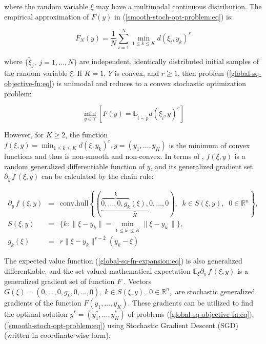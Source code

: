 \noindent where the random variable $\xi$ may have a multimodal continuous distribution. The empirical approximation of $F(y)$ in (\ref{smooth-stoch-opt-problem:eq}) is:

\begin{equation}
    \label{empirical-stoch-fn-expansion:eq}
    F_N(y) = \frac{1}{N} \sum_{i=1}^N \min_{1 \leq k \leq K} d(\xi_i, y_k)^r
\end{equation}

\noindent where $\{\tilde{\xi}_j,\; j = 1, \ldots, N\}$ are independent, identically distributed initial samples of the random variable $\xi$. If $K = 1$, $Y$ is convex, and $r\geq 1$, then problem (\ref{global-sq-objective-fn:eq}) is unimodal and reduces to a convex stochastic optimization problem:

\begin{equation}
    \label{convex-stoch-opt-problem:eq}
    \min_{y \in Y} [ F(y) =  \mathbb{E}_{\tilde{i} \sim p} d(\xi_{\tilde{i}}, y)^r ]
\end{equation}

However, for $K \geq 2$, the function $f(\xi, y) = \min_{1 \leq k \leq K} d(\xi, y_k)^r, y = (y_1, \ldots, y_K)$ is the minimum of convex functions and thus is non-smooth and non-convex. In terms of \cite{mikhalevich2024,Norkin_1986}, $f(\xi, y)$ is a random generalized differentiable function of $y$, and its generalized gradient set $\partial_y \,f\,(\xi,y)$ can be calculated by the chain rule:

\begin{eqnarray}
    \label{sq-objective-fn-gradient:eq}
    \partial_y \,f\,(\xi, y) &=& \text{conv.hull} \left\{ \left(\underbrace{\overbrace{0, \ldots, 0, g_{k}}^k(\xi), 0, \ldots, 0}_K\right), \;\; k \in S(\xi, y), \;\; 0 \in \mathbb{R}^n \right\}, \nonumber \\
    S(\xi, y) &=& \{ k: \| \xi - y_{k} \| = \min_{1 \leq k^{\prime} \leq K} \| \xi - y_{k^{\prime}} \| \}, \nonumber \\
    g_{k}(\xi) &=& r \| \xi - y_{k} \|^{r - 2} (y_{k} - \xi)
\end{eqnarray}

The expected value function (\ref{global-sq-fn-expansion:eq}) is also generalized differentiable, and the set-valued mathematical expectation $\mathbb{E}_{\xi} \partial_y\, f\,(\xi, y)$ is a generalized gradient set of function $F$ \cite{mikhalevich2024,Norkin_1986}. Vectors $G(\xi) = (0, \ldots, 0, g_k, 0, \ldots, 0), \;k \in S(\xi, y), \;0 \in \mathbb{R}^n,$ are stochastic generalized gradients of the function $F(y_1, \ldots, y_K)$. These gradients can be utilized to find the optimal solution $y^{*}=(y_1^{*},\ldots,y_K^{*})$ of problems (\ref{global-sq-objective-fn:eq}), (\ref{smooth-stoch-opt-problem:eq}) using Stochastic Gradient Descent (SGD) \cite{Robbins_Monro_1951,kiefer1952stochastic,ermoliev1976stochastic,Norkin_Kozyriev_Norkin_2024} (written in coordinate-wise form):

